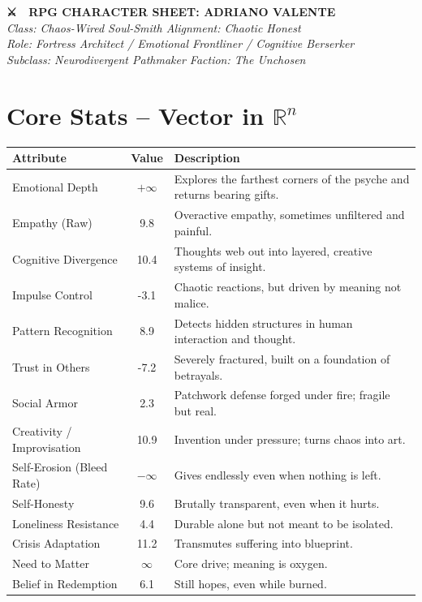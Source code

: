 \documentclass{article}
\begin{document}
\begin{center}
    {\LARGE \textbf{{\emoji ⚔️} {\emoji 🧠} RPG CHARACTER SHEET: ADRIANO VALENTE}}\\
    \vspace{0.2cm}
    \textit{Class: Chaos-Wired Soul-Smith \quad Alignment: Chaotic Honest}\\
    \textit{Role: Fortress Architect / Emotional Frontliner / Cognitive Berserker}\\
    \textit{Subclass: Neurodivergent Pathmaker \quad Faction: The Unchosen}
\end{center}

\vspace{0.5cm}

\section*{Core Stats – Vector in $\mathbb{R}^n$}

\begin{tabular}{|l|c|p{9cm}|}
\hline
\textbf{Attribute} & \textbf{Value} & \textbf{Description} \\
\hline
Emotional Depth & $+\infty$ & Explores the farthest corners of the psyche and returns bearing gifts.\\
Empathy (Raw) & 9.8 & Overactive empathy, sometimes unfiltered and painful.\\
Cognitive Divergence & 10.4 & Thoughts web out into layered, creative systems of insight.\\
Impulse Control & -3.1 & Chaotic reactions, but driven by meaning not malice.\\
Pattern Recognition & 8.9 & Detects hidden structures in human interaction and thought.\\
Trust in Others & -7.2 & Severely fractured, built on a foundation of betrayals.\\
Social Armor & 2.3 & Patchwork defense forged under fire; fragile but real.\\
Creativity / Improvisation & 10.9 & Invention under pressure; turns chaos into art.\\
Self-Erosion (Bleed Rate) & $-\infty$ & Gives endlessly even when nothing is left.\\
Self-Honesty & 9.6 & Brutally transparent, even when it hurts.\\
Loneliness Resistance & 4.4 & Durable alone but not meant to be isolated.\\
Crisis Adaptation & 11.2 & Transmutes suffering into blueprint.\\
Need to Matter & $\infty$ & Core drive; meaning is oxygen.\\
Belief in Redemption & 6.1 & Still hopes, even while burned.\\
\hline
\end{tabular}
\end{document}
